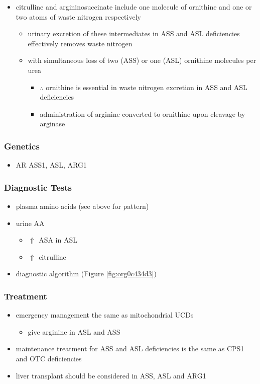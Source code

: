 \documentclass[12pt]{scrartcl}
\begin{document}
\begin{center}
\begin{center}
\begin{itemize}
\item citrulline and argininosuccinate include one molecule of ornithine
and one or two atoms of waste nitrogen respectively
\begin{itemize}
\item urinary excretion of these intermediates in ASS and ASL
deficiencies effectively removes waste nitrogen
\item with simultaneous loss of two (ASS) or one (ASL) ornithine
molecules per urea
\begin{itemize}
\item \(\therefore\) ornithine is essential in waste nitrogen excretion in
ASS and ASL deficiencies
\item administration of arginine converted to ornithine upon cleavage by arginase
\end{itemize}
\end{itemize}
\end{itemize}

\subsubsection{Genetics}
\label{sec:orgedeed4e}
\begin{itemize}
\item AR ASS1, ASL, ARG1
\end{itemize}

\subsubsection{Diagnostic Tests}
\label{sec:org6607b8c}
\begin{itemize}
\item plasma amino acids (see above for pattern)
\item urine AA
\begin{itemize}
\item \(\Uparrow\) ASA in ASL
\item \(\Uparrow\) citrulline
\end{itemize}
\item diagnostic algorithm (Figure \ref{fig:org0c434d3})
\end{itemize}

\subsubsection{Treatment}
\label{sec:org73780e6}
\begin{itemize}
\item emergency management the same as mitochondrial UCDs
\begin{itemize}
\item give arginine in ASL and ASS
\end{itemize}
\item maintenance treatment for ASS and ASL deficiencies is the same as
CPS1 and OTC deficiencies
\item liver transplant should be considered in ASS, ASL and ARG1
\end{itemize}


\end{center}
\end{center}
\end{document}
